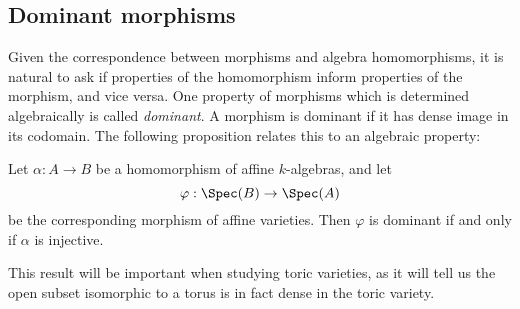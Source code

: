 \subsection{Dominant morphisms}
Given the correspondence between morphisms and algebra homomorphisms, it is natural to ask if properties of the homomorphism inform properties of the morphism, and vice versa.
One property of morphisms which is determined algebraically is called \emph{dominant}.
A morphism is dominant if it has dense image in its codomain.
The following proposition relates this to an algebraic property:

\begin{proposition}
Let $\alpha : A \to B$ be a homomorphism of affine $k$-algebras, and let 
$$\varphi: \Spec(B) \to \Spec(A)$$
be the corresponding morphism of affine varieties.
Then $\varphi$ is dominant if and only if $\alpha$ is injective.
\end{proposition}

This result will be important when studying toric varieties, as it will tell us the open subset isomorphic to a torus is in fact dense in the toric variety.
